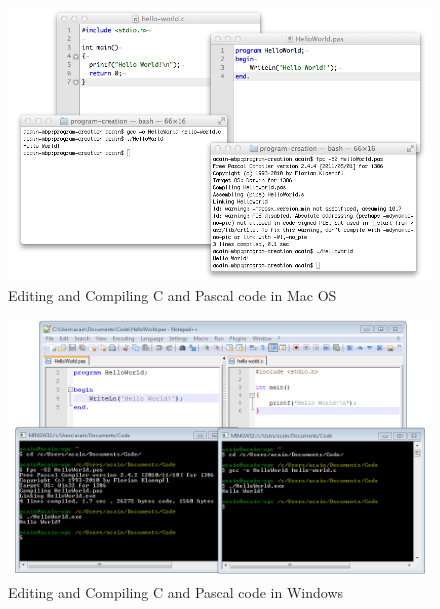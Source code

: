 \begin{figure}[h]
   \centering
   \includegraphics[width=\textwidth]{./topics/programs-and-compilers/images/MacEditors} 
   \caption{Editing and Compiling C and Pascal code in Mac OS}
   \label{fig:mac-editors}
\end{figure}

\begin{figure}[h]
   \centering
   \includegraphics[width=\textwidth]{./topics/programs-and-compilers/images/WindowsEditors} 
   \caption{Editing and Compiling C and Pascal code in Windows}
   \label{fig:windows-editors}
\end{figure}



